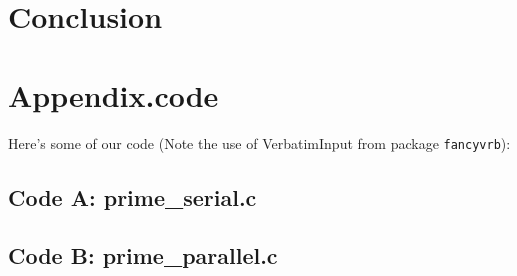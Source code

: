 \documentclass[11pt]{article}
\begin{document}
\begin{enumerate}
{%
  


\section*{Conclusion}





 


\newpage

\section{Appendix.code}

Here's some of our code (Note the use of VerbatimInput from package \texttt{fancyvrb}):


\subsection{Code A: prime\_serial.c}


\begin{footnotesize}

\end{footnotesize}




\subsection{Code B: prime\_parallel.c}


\begin{footnotesize}

\end{footnotesize}




}
\end{enumerate}
\end{document}
